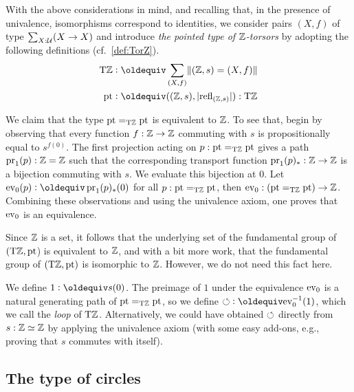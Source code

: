 \documentclass[a4paper,12pt]{amsart}
\begin{document}
With the above considerations in mind, and recalling that, in the presence of univalence, isomorphisms correspond to identities,
we consider pairs $(X,f)$ of type $\sum_{X:\mathcal{U}}(X\to X)$
and introduce \emph{the pointed type of $\mathbb{Z}$-torsors} by adopting the following definitions
(cf.~\cref{def:TorZ}).
\begin{align*}
  \TorZ &\defeq \sum_{(X,f)}\Trunc{(\zet,s)=(X,f)}  \\
  \pt & \defeq ((\zet,s),\trunc{\refl{(\zet,s)}}) : \TorZ
\end{align*}

{We claim}
that the type ${\mathord{\mathrm{pt}}} =_{\mathrm{T}\mathbb{Z}} {\mathord{\mathrm{pt}}}$ is equivalent to $\mathbb{Z}$.
To see that,
begin by observing that every function $f:\mathbb{Z}\to\mathbb{Z}$ commuting with $s$
is propositionally equal to $s^{f(0)}$.  The first projection
acting on $p : {\mathord{\mathrm{pt}}} =_{\mathrm{T}\mathbb{Z}} {\mathord{\mathrm{pt}}}$ gives a path $\operatorname{pr}_1(p) : \mathbb{Z}=\mathbb{Z}$
such that the corresponding transport function $\operatorname{pr}_1(p)_* : \mathbb{Z}\to\mathbb{Z}$
is a bijection commuting with $s$. We evaluate this bijection {at} $0$.
Let $\ev_0(p) \defeq \pr_1(p)_*(0)$ for all $p : {\mathord{\mathrm{pt}}} =_{\mathrm{T}\mathbb{Z}} {\mathord{\mathrm{pt}}}$,
then $\mathrm{ev}_0 : ({\mathord{\mathrm{pt}}} =_{\mathrm{T}\mathbb{Z}} {\mathord{\mathrm{pt}}}) \to \mathbb{Z}$.  Combining these observations {and}
using the univalence axiom, one proves that $\mathrm{ev}_0$ is an equivalence.

Since $\mathbb{Z}$ is a set, it follows that the underlying set of the fundamental group of $({\mathrm{T}\mathbb{Z}},{\mathord{\mathrm{pt}}}$) is equivalent to $\mathbb{Z}$,
and with a bit more work, that the fundamental group of $({\mathrm{T}\mathbb{Z}},{\mathord{\mathrm{pt}}})$ is isomorphic to $\mathbb{Z}$.
However, we do not need this fact here.

We define $1 \defeq s(0)$.
The preimage of $1$ under the equivalence $\mathrm{ev}_0$ is a
natural generating path of ${\mathord{\mathrm{pt}}} =_{\mathrm{T}\mathbb{Z}} {\mathord{\mathrm{pt}}}$, so we define
${\Zloop}\defeq \ev_0^{-1}(1)$, which we call the \emph{loop}
of ${\mathrm{T}\mathbb{Z}}$. Alternatively, we could have obtained ${\circlearrowleft}$
directly from $s: \mathbb{Z}\simeq\mathbb{Z}$ by applying the univalence axiom
(with some easy add-ons, e.g., proving that $s$ commutes with itself).

\subsection{The type of circles}
\label{sec:circles}
\end{document}
